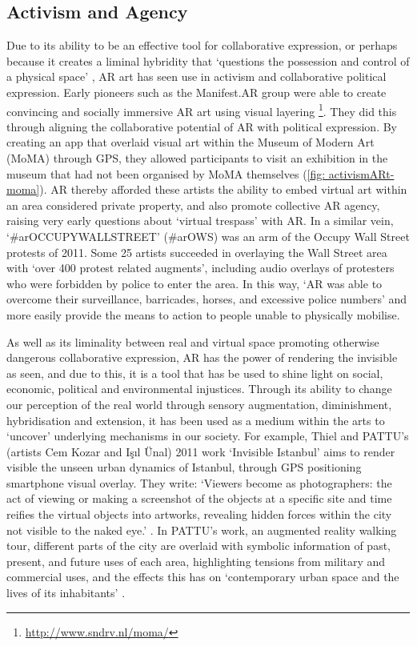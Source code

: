 \subsection{Activism and Agency}\label{sec: ar-arts-activism}
Due to its ability to be an effective tool for collaborative expression, or perhaps because it creates a liminal hybridity that `questions the possession and control of a physical space' \citep{thiel2018}, AR art has seen use in activism and collaborative political expression. Early pioneers such as the Manifest.AR group were able to create convincing and socially immersive AR art using visual layering \footnote{\url{http://www.sndrv.nl/moma/}}. They did this through aligning the collaborative potential of AR with political expression. By creating an app that overlaid visual art within the Museum of Modern Art (MoMA) through GPS, they allowed participants to visit an exhibition in the museum that had not been organised by MoMA themselves (\autoref{fig: activismARt-moma}). AR thereby afforded these artists the ability to embed virtual art within an area considered private property, and also promote collective AR agency, raising very early questions about `virtual trespass' with AR. In a similar vein, `\#arOCCUPYWALLSTREET' (\#arOWS) was an arm of the Occupy Wall Street protests of 2011. Some 25 artists succeeded in overlaying the Wall Street area with `over 400 protest related augments', including audio overlays of protesters who were forbidden by police to enter the area. In this way, `AR was able to overcome their surveillance, barricades, horses, and excessive police numbers' \citeyearpar{skwarek2018} and more easily provide the means to action to people unable to physically mobilise.

As well as its liminality between real and virtual space promoting otherwise dangerous collaborative expression, AR has the power of rendering the invisible as seen, and due to this, it is a tool that has be used to shine light on social, economic, political and environmental injustices. Through its ability to change our perception of the real world through sensory augmentation, diminishment, hybridisation and extension, it has been used as a medium within the arts to `uncover' underlying mechanisms in our society. For example, Thiel and PATTU's (artists Cem Kozar and Işıl Ünal) 2011 work `Invisible Istanbul' aims to render visible the unseen urban dynamics of Istanbul, through GPS positioning smartphone visual overlay. They write: `Viewers become as photographers: the act of viewing or making a screenshot of the objects at a specific site and time reifies the virtual objects into artworks, revealing hidden forces within the city not visible to the naked eye.' \citeyearpar{thiel2011}. In PATTU's work, an augmented reality walking tour, different parts of the city are overlaid with symbolic information of past, present, and future uses of each area, highlighting tensions from military and commercial uses, and the effects this has on `contemporary urban space and the lives of its inhabitants' \citeyearpar{thiel2018}.


